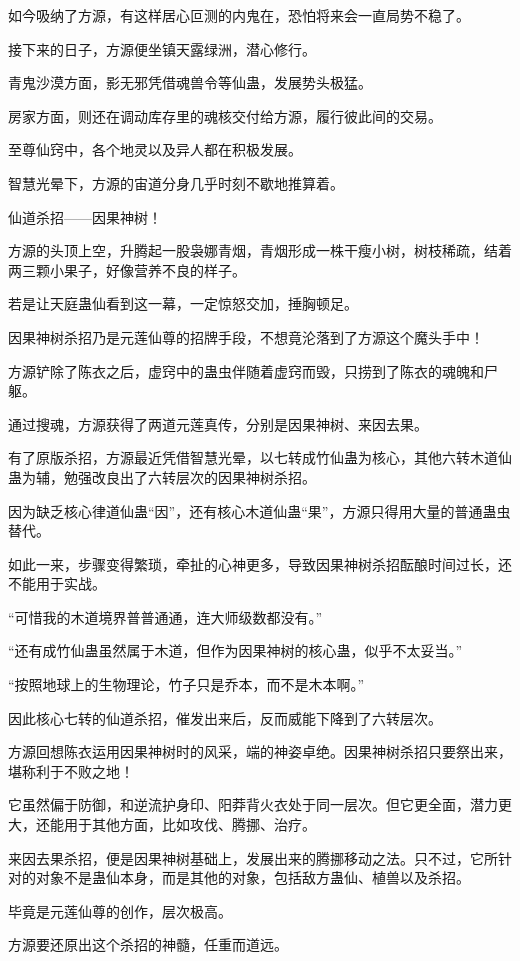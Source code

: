 \begin{this_body}
如今吸纳了方源，有这样居心叵测的内鬼在，恐怕将来会一直局势不稳了。

接下来的日子，方源便坐镇天露绿洲，潜心修行。

青鬼沙漠方面，影无邪凭借魂兽令等仙蛊，发展势头极猛。

房家方面，则还在调动库存里的魂核交付给方源，履行彼此间的交易。

至尊仙窍中，各个地灵以及异人都在积极发展。

智慧光晕下，方源的宙道分身几乎时刻不歇地推算着。

仙道杀招——因果神树！

方源的头顶上空，升腾起一股袅娜青烟，青烟形成一株干瘦小树，树枝稀疏，结着两三颗小果子，好像营养不良的样子。

若是让天庭蛊仙看到这一幕，一定惊怒交加，捶胸顿足。

因果神树杀招乃是元莲仙尊的招牌手段，不想竟沦落到了方源这个魔头手中！

方源铲除了陈衣之后，虚窍中的蛊虫伴随着虚窍而毁，只捞到了陈衣的魂魄和尸躯。

通过搜魂，方源获得了两道元莲真传，分别是因果神树、来因去果。

有了原版杀招，方源最近凭借智慧光晕，以七转成竹仙蛊为核心，其他六转木道仙蛊为辅，勉强改良出了六转层次的因果神树杀招。

因为缺乏核心律道仙蛊“因”，还有核心木道仙蛊“果”，方源只得用大量的普通蛊虫替代。

如此一来，步骤变得繁琐，牵扯的心神更多，导致因果神树杀招酝酿时间过长，还不能用于实战。

“可惜我的木道境界普普通通，连大师级数都没有。”

“还有成竹仙蛊虽然属于木道，但作为因果神树的核心蛊，似乎不太妥当。”

“按照地球上的生物理论，竹子只是乔本，而不是木本啊。”

因此核心七转的仙道杀招，催发出来后，反而威能下降到了六转层次。

方源回想陈衣运用因果神树时的风采，端的神姿卓绝。因果神树杀招只要祭出来，堪称利于不败之地！

它虽然偏于防御，和逆流护身印、阳莽背火衣处于同一层次。但它更全面，潜力更大，还能用于其他方面，比如攻伐、腾挪、治疗。

来因去果杀招，便是因果神树基础上，发展出来的腾挪移动之法。只不过，它所针对的对象不是蛊仙本身，而是其他的对象，包括敌方蛊仙、植兽以及杀招。

毕竟是元莲仙尊的创作，层次极高。

方源要还原出这个杀招的神髓，任重而道远。


\end{this_body}
